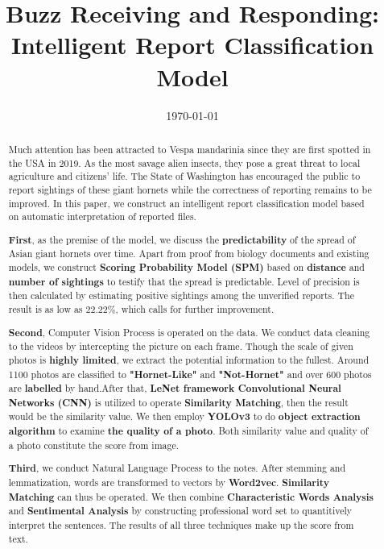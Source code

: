 \documentclass{mcmthesis}
\begin{document}
\linespread{0.6} %
\setlength{\parskip}{0.5\baselineskip} %
\title{Buzz Receiving and Responding: Intelligent Report Classification Model}

\date{\today}
\begin{abstract}

 		Much attention has been attracted to Vespa mandarinia since they are first spotted in the USA in 2019. As the most savage alien insects, they pose a great threat to local agriculture and citizens' life. The State of Washington has encouraged the public to report sightings of these giant hornets while the correctness of reporting remains to be improved. In this paper, we construct an intelligent  report classification model based on automatic interpretation of reported files.
		
		\textbf{First}, as the premise of the model, we discuss the \textbf{predictability} of the spread of Asian giant hornets over time. Apart from proof from biology documents and existing models, we construct  \textbf{Scoring Probability Model (SPM)}  based on \textbf{distance} and \textbf{number of sightings} to testify that the spread is predictable. Level of precision is then calculated by estimating positive sightings among the unverified reports. The result is as low as  $22.22\%$, which calls for further improvement.
		
		\textbf{Second}, Computer Vision Process is operated on the data. We conduct data cleaning to the videos by intercepting the picture on each frame. Though the scale of given photos is \textbf{highly limited}, we extract the potential information to the fullest. Around 1100 photos are classified to \textbf{"Hornet-Like"} and \textbf{"Not-Hornet"} and over 600 photos are \textbf{labelled} by hand.After that, \textbf{LeNet framework Convolutional Neural Networks (CNN)} is utilized to operate \textbf{Similarity Matching}, then the result would be the similarity value.  We  then employ \textbf{YOLOv3} to do \textbf{object extraction algorithm} to examine  \textbf{the quality of a photo}. Both similarity value and quality of a photo constitute the score from image.
		
		\textbf{Third}, we conduct Natural Language Process to the notes. After stemming and lemmatization, words are transformed to vectors by \textbf{Word2vec}. \textbf{Similarity Matching} can thus be operated. We then combine \textbf{Characteristic Words Analysis} and \textbf{Sentimental Analysis} by constructing professional word set to quantitively interpret the sentences. The results of all three techniques make up the score from text.
		

\end{abstract}
\end{document}
